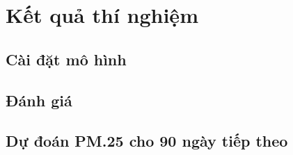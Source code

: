 \section{Kết quả thí nghiệm}
\subsection{Cài đặt mô hình}










\subsection{Đánh giá}



\subsection{Dự đoán PM.25 cho 90 ngày tiếp theo}












